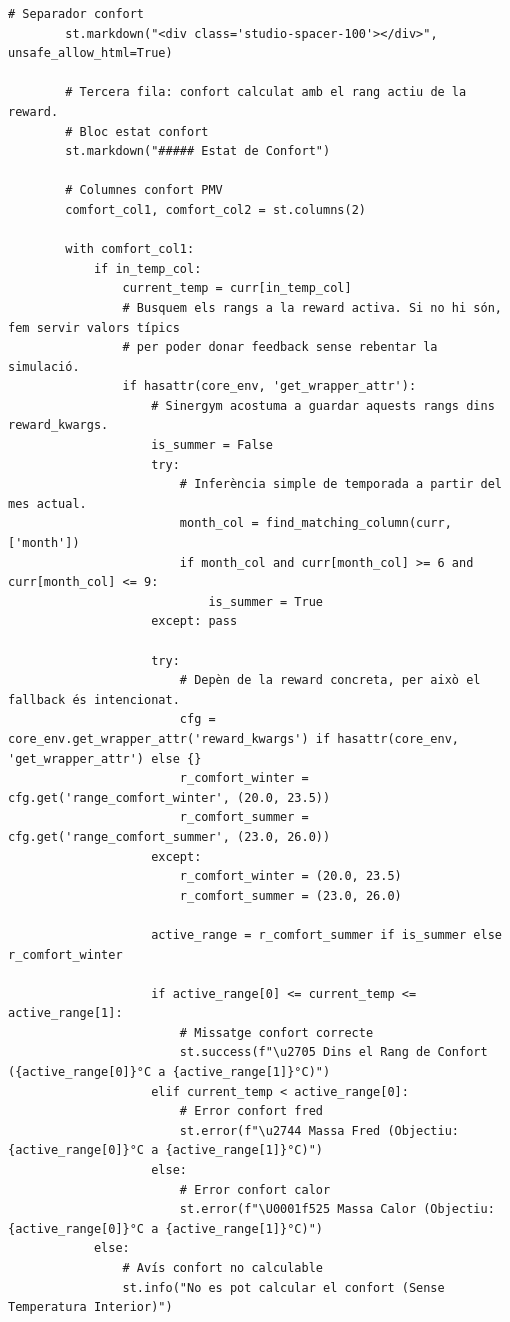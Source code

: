 \documentclass[10pt,a4paper]{article}
\begin{document}
\begin{lstlisting}[style=studioPython,caption={pages/Interaccionar\_amb\_l'Agent.py},label={lst:pages-interaccionar-amb-l-agent-py}]
        # Separador confort
        st.markdown("<div class='studio-spacer-100'></div>", unsafe_allow_html=True)

        # Tercera fila: confort calculat amb el rang actiu de la reward.
        # Bloc estat confort
        st.markdown("##### Estat de Confort")

        # Columnes confort PMV
        comfort_col1, comfort_col2 = st.columns(2)

        with comfort_col1:
            if in_temp_col:
                current_temp = curr[in_temp_col]
                # Busquem els rangs a la reward activa. Si no hi són, fem servir valors típics
                # per poder donar feedback sense rebentar la simulació.
                if hasattr(core_env, 'get_wrapper_attr'):
                    # Sinergym acostuma a guardar aquests rangs dins reward_kwargs.
                    is_summer = False
                    try:
                        # Inferència simple de temporada a partir del mes actual.
                        month_col = find_matching_column(curr, ['month'])
                        if month_col and curr[month_col] >= 6 and curr[month_col] <= 9:
                            is_summer = True
                    except: pass

                    try:
                        # Depèn de la reward concreta, per això el fallback és intencionat.
                        cfg = core_env.get_wrapper_attr('reward_kwargs') if hasattr(core_env, 'get_wrapper_attr') else {}
                        r_comfort_winter = cfg.get('range_comfort_winter', (20.0, 23.5))
                        r_comfort_summer = cfg.get('range_comfort_summer', (23.0, 26.0))
                    except:
                        r_comfort_winter = (20.0, 23.5)
                        r_comfort_summer = (23.0, 26.0)

                    active_range = r_comfort_summer if is_summer else r_comfort_winter

                    if active_range[0] <= current_temp <= active_range[1]:
                        # Missatge confort correcte
                        st.success(f"\u2705 Dins el Rang de Confort ({active_range[0]}°C a {active_range[1]}°C)")
                    elif current_temp < active_range[0]:
                        # Error confort fred
                        st.error(f"\u2744 Massa Fred (Objectiu: {active_range[0]}°C a {active_range[1]}°C)")
                    else:
                        # Error confort calor
                        st.error(f"\U0001f525 Massa Calor (Objectiu: {active_range[0]}°C a {active_range[1]}°C)")
            else:
                # Avís confort no calculable
                st.info("No es pot calcular el confort (Sense Temperatura Interior)")


\end{lstlisting}
\end{document}

